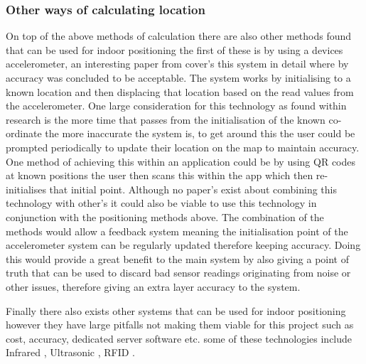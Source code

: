 \subsubsection{Other ways of calculating location}
On top of the above methods of calculation there are also other methods found that can be used for indoor positioning the first of these is by using a devices accelerometer, an interesting paper from \citetemp cover's this system in detail where by accuracy was concluded to be acceptable. The system works by initialising to a known location and then displacing that location based on the read values from the accelerometer. One large consideration for this technology as found within \citetemp research is the more time that passes from the initialisation of the known co-ordinate the more inaccurate the system is, to get around this the user could be prompted periodically to update their location on the map to maintain accuracy. One method of achieving this within an application could be by using QR codes at known positions the user then scans this within the app which then re-initialises that initial point. Although no paper's exist about combining this technology with other's it could also be viable to use this technology in conjunction with the positioning methods above. The combination of the methods would allow a feedback system meaning the initialisation point of the accelerometer system can be regularly updated therefore keeping accuracy. Doing this would provide a great benefit to the main system by also giving a point of truth that can be used to discard bad sensor readings originating from noise or other issues, therefore giving an extra layer accuracy to the system.


Finally there also exists other systems that can be used for indoor positioning however they have large pitfalls not making them viable for this project such as cost, accuracy, dedicated server software etc. some of these technologies include Infrared \citetemp, Ultrasonic \citetemp, RFID \citetemp. 
